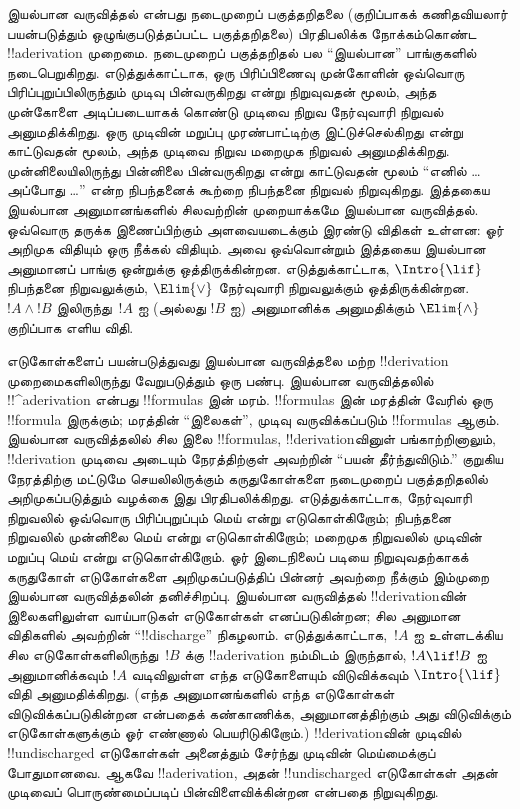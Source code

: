 \documentclass[../../../include/open-logic-section]{subfiles}
\begin{document}
      {}
      {}


இயல்பான வருவித்தல் என்பது நடைமுறைப் பகுத்தறிதலை (குறிப்பாகக் கணிதவியலார்
பயன்படுத்தும் ஒழுங்குபடுத்தப்பட்ட பகுத்தறிதலை) பிரதிபலிக்க நோக்கம்கொண்ட
!!a{derivation} முறைமை. நடைமுறைப் பகுத்தறிதல் பல ``இயல்பான''
பாங்குகளில் நடைபெறுகிறது. எடுத்துக்காட்டாக, ஒரு பிரிப்பிணைவு முன்கோளின்
ஒவ்வொரு பிரிப்புறுப்பிலிருந்தும் முடிவு பின்வருகிறது என்று நிறுவுவதன் மூலம்,
அந்த முன்கோளை அடிப்படையாகக் கொண்டு முடிவை நிறுவ நேர்வுவாரி நிறுவல்
அனுமதிக்கிறது. ஒரு முடிவின் மறுப்பு முரண்பாட்டிற்கு இட்டுச்செல்கிறது என்று
காட்டுவதன் மூலம், அந்த முடிவை நிறுவ மறைமுக நிறுவல் அனுமதிக்கிறது. முன்னிலையிலிருந்து
பின்னிலை பின்வருகிறது என்று காட்டுவதன் மூலம் ``எனில் \dots அப்போது \dots''
என்ற நிபந்தனைக் கூற்றை நிபந்தனை நிறுவல் நிறுவுகிறது. இத்தகைய இயல்பான
அனுமானங்களில் சிலவற்றின் முறையாக்கமே இயல்பான வருவித்தல். ஒவ்வொரு தருக்க
இணைப்பிற்கும் அளவையடைக்கும் இரண்டு விதிகள் உள்ளன: ஓர் அறிமுக விதியும்
ஒரு நீக்கல் விதியும். அவை ஒவ்வொன்றும் இத்தகைய இயல்பான அனுமானப் பாங்கு
ஒன்றுக்கு ஒத்திருக்கின்றன. எடுத்துக்காட்டாக, $\Intro{\lif}$ நிபந்தனை
நிறுவலுக்கும், $\Elim{\lor}$ நேர்வுவாரி நிறுவலுக்கும் ஒத்திருக்கின்றன.
$!A \land !B$ இலிருந்து~$!A$ ஐ (அல்லது $!B$ ஐ) அனுமானிக்க அனுமதிக்கும்
$\Elim{\land}$ குறிப்பாக எளிய விதி.

எடுகோள்களைப் பயன்படுத்துவது இயல்பான வருவித்தலை மற்ற !!{derivation}
முறைமைகளிலிருந்து வேறுபடுத்தும் ஒரு பண்பு. இயல்பான வருவித்தலில்
!!^a{derivation} என்பது !!{formula}s இன் மரம். !!{formula}s இன் மரத்தின்
வேரில் ஒரு !!{formula} இருக்கும்; மரத்தின் ``இலைகள்'', முடிவு
வருவிக்கப்படும் !!{formula}s ஆகும். இயல்பான வருவித்தலில் சில இலை
!!{formula}s, !!{derivation}வினுள் பங்காற்றினாலும், !!{derivation} முடிவை
அடையும் நேரத்திற்குள் அவற்றின் ``பயன் தீர்ந்துவிடும்.'' குறுகிய நேரத்திற்கு
மட்டுமே செயலிலிருக்கும் கருதுகோள்களை நடைமுறைப் பகுத்தறிதலில் அறிமுகப்படுத்தும்
வழக்கை இது பிரதிபலிக்கிறது. எடுத்துக்காட்டாக, நேர்வுவாரி நிறுவலில் ஒவ்வொரு
பிரிப்புறுப்பும் மெய் என்று எடுகொள்கிறோம்; நிபந்தனை நிறுவலில் முன்னிலை மெய்
என்று எடுகொள்கிறோம்; மறைமுக நிறுவலில் முடிவின் மறுப்பு மெய் என்று
எடுகொள்கிறோம். ஓர் இடைநிலைப் படியை நிறுவுவதற்காகக் கருதுகோள் எடுகோள்களை
அறிமுகப்படுத்திப் பின்னர் அவற்றை நீக்கும் இம்முறை இயல்பான வருவித்தலின்
தனிச்சிறப்பு. இயல்பான வருவித்தல் !!{derivation}வின் இலைகளிலுள்ள
வாய்பாடுகள் எடுகோள்கள் எனப்படுகின்றன; சில அனுமான விதிகளில் அவற்றின்
``!!{discharge}'' நிகழலாம். எடுத்துக்காட்டாக,~$!A$ ஐ உள்ளடக்கிய சில
எடுகோள்களிலிருந்து~$!B$ க்கு !!a{derivation} நம்மிடம் இருந்தால்,
$!A \lif !B$ ஐ அனுமானிக்கவும் $!A$ வடிவிலுள்ள எந்த எடுகோளையும்
விடுவிக்கவும் $\Intro{\lif}$ விதி அனுமதிக்கிறது. (எந்த அனுமானங்களில் எந்த
எடுகோள்கள் விடுவிக்கப்படுகின்றன என்பதைக் கண்காணிக்க, அனுமானத்திற்கும் அது
விடுவிக்கும் எடுகோள்களுக்கும் ஓர் எண்ணால் பெயரிடுகிறோம்.) !!{derivation}வின்
முடிவில் !!{undischarged} எடுகோள்கள் அனைத்தும் சேர்ந்து முடிவின் மெய்மைக்குப்
போதுமானவை. ஆகவே !!a{derivation}, அதன் !!{undischarged} எடுகோள்கள் அதன்
முடிவைப் பொருண்மைப்படிப் பின்விளைவிக்கின்றன என்பதை நிறுவுகிறது.
\end{document}
